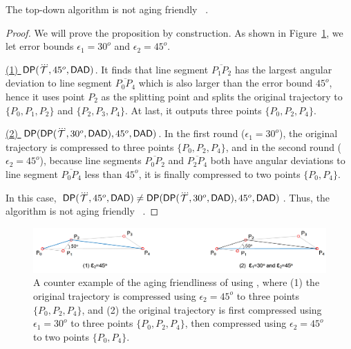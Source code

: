 
\begin{proposition}
	\label{theo-aging-dp-dad}
	The top-down algorithm \dpa is not aging friendly \wrt~\dad.
\end{proposition}

\begin{proof}
	We will prove the proposition by construction.
	As shown in Figure~\ref{fig:aging-dp-dad}, we let error bounds $\epsilon_1 =30^o$ and $\epsilon_2=45^o$.
	
	\underline{(1) ${{\mathsf{DP}}}(\dddot{\mathcal{T}}, 45^o, {\mathsf{DAD}})$}. It finds that line segment $\overline{P_1P_2}$ has the largest angular deviation to line segment $\overline{P_0P_4}$ which is also larger than the error bound $45^o$, hence it uses point $P_2$ as the splitting point and splits the original trajectory to $\{P_0, P_1, P_2\}$ and $\{P_2, P_3, P_4\}$. At last, it outputs three points $\{P_0, P_2, P_4\}$.
	
	\underline{(2) ${{\mathsf{DP}}}({\mathsf{DP}}(\dddot{\mathcal{T}}, 30^o, {\mathsf{DAD}}), 45^o, {\mathsf{DAD}})$}. In the first round ($\epsilon_1=30^o$), the original trajectory is compressed to three points $\{P_0, P_2, P_4\}$, and in the second round ($\epsilon_2=45^o$), because line segments  $\overline{P_0P_2}$ and $\overline{P_2P_4}$ both have angular deviations to line segment $\overline{P_0P_4}$ less than $45^o$, it is finally compressed to two points $\{P_0, P_4\}$.
	
	In this case, ${{\mathsf{DP}}}(\dddot{\mathcal{T}}, 45^o, {\mathsf{DAD}}) \ne {{\ensuremath {\mathsf{DP}}}}({\mathsf{DP}}(\dddot{\mathcal{T}}, 30^o, {\mathsf{DAD}}), 45^o, {\mathsf{DAD}})$. Thus, the \dpa algorithm is not aging friendly \wrt~\dad.
\end{proof}

\begin{figure}
	\centering
	\includegraphics[scale=0.66]{Figures/Fig-aging-dp.png}
	
	\caption{\small A counter example of the aging friendliness of \dpa using \dad, where (1) the original trajectory is compressed using $\epsilon_2=45^o$ to three points $\{P_0, P_2, P_4\}$, and (2) the original trajectory is first compressed using $\epsilon_1=30^o$ to three points $\{P_0, P_2, P_4\}$, then compressed using $\epsilon_2=45^o$ to two points $\{P_0, P_4\}$. }
	\vspace{-1ex}
	\label{fig:aging-dp-dad}
\end{figure}


